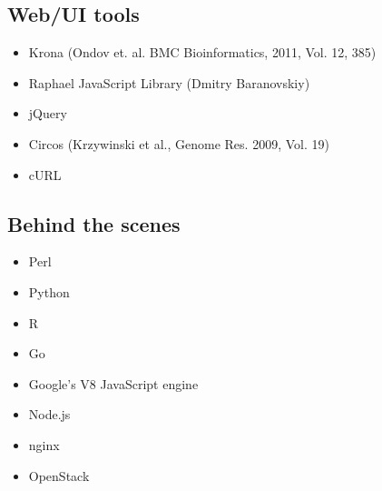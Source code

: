 \documentclass[12pt,fullpage]{report}
\begin{document}
\begin{appendices}
\subsection{Web/UI tools}
\begin{itemize}
  \item    Krona \cite{KRONA} (Ondov et. al. BMC Bioinformatics, 2011, Vol. 12, 385)
  \item    Raphael JavaScript Library (Dmitry Baranovskiy)
 \item     jQuery
  \item    Circos (Krzywinski et al., Genome Res. 2009, Vol. 19)
  \item    cURL
\end{itemize}
\subsection{Behind the scenes}
\begin{itemize}
  \item    Perl
  \item    Python
  \item    R
  \item    Go
  \item    Google's V8  JavaScript engine
\item      Node.js
 \item     nginx
 \item     OpenStack
\end{itemize}
\end{appendices}
\clearpage
{}
{}
\listoffigures
\end{document}
